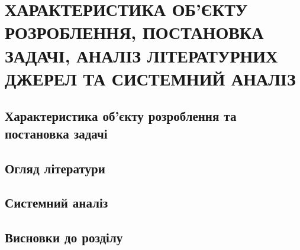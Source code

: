 \chapter{ХАРАКТЕРИСТИКА ОБ'ЄКТУ РОЗРОБЛЕННЯ, ПОСТАНОВКА ЗАДАЧІ, АНАЛІЗ ЛІТЕРАТУРНИХ ДЖЕРЕЛ ТА СИСТЕМНИЙ АНАЛІЗ}

\section{Характеристика об'єкту розроблення та постановка задачі}
\section{Огляд літератури}
\section{Системний аналіз}
\section{Висновки до розділу}
